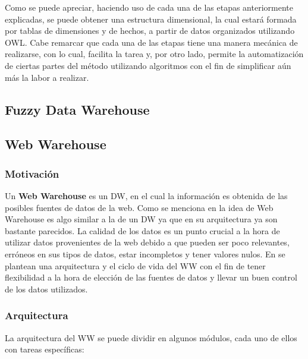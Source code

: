 \documentclass[a4paper,11pt]{article}
\begin{document}
\begin{flushleft}
    
    Como se puede apreciar, haciendo uso de cada una de las etapas anteriormente explicadas, se puede obtener una estructura dimensional, la cual estará
    formada por tablas de dimensiones y de hechos, a partir de datos organizados utilizando OWL. Cabe remarcar que cada una de las etapas tiene una manera
    mecánica de realizarse, con lo cual, facilita la tarea y, por otro lado, permite la automatización de ciertas partes del método utilizando algoritmos con el
    fin de simplificar aún más la labor a realizar.
    
    \subsection{Fuzzy Data Warehouse}
    
    
    \subsection{Web Warehouse}
    
    \subsubsection{Motivación}
    
    Un \textbf{Web Warehouse} es un DW, en el cual la información es obtenida de las posibles fuentes de datos de la web. Como se menciona en \cite{webwarehouse}
    la idea de Web Warehouse es algo similar a la de un DW ya que en su arquitectura ya son bastante parecidos. La calidad de los datos es un punto crucial a la
    hora de utilizar datos provenientes de la web debido a que pueden ser poco relevantes, erróneos en sus tipos de datos, estar incompletos y tener valores
    nulos. En \cite{webwarehouse} se plantean una arquitectura y el ciclo de vida del WW con el fin de tener flexibilidad a la hora de elección de las fuentes de
    datos y llevar un buen control de los datos utilizados.
    
    
    \subsubsection{Arquitectura}
    
    La arquitectura del WW se puede dividir en algunos módulos, cada uno de ellos con tareas específicas:
    

\end{flushleft}
\end{document}
